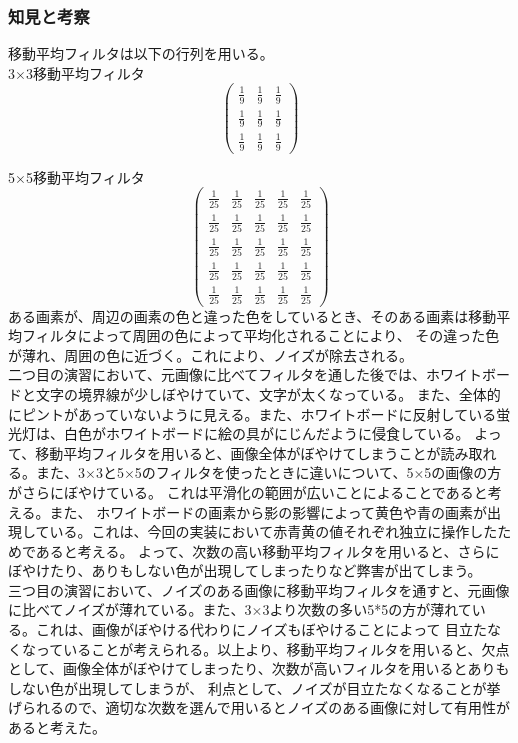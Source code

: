 ﻿\documentclass[a4j,11pt]{jarticle}
\begin{document}
\subsubsection{知見と考察}
移動平均フィルタは以下の行列を用いる。\\
3$\times$3移動平均フィルタ
$$
\begin{pmatrix}
  \frac1 9 & \frac1 9 & \frac1 9 \\
  \frac1 9 & \frac1 9 & \frac1 9 \\
  \frac1 9 & \frac1 9 & \frac1 9  

\end{pmatrix}
$$

5$\times$5移動平均フィルタ
$$
\begin{pmatrix}
  \frac1 {25} & \frac1 {25} & \frac1 {25} & \frac1 {25} & \frac1 {25}\\
  \frac1 {25} & \frac1 {25} & \frac1 {25} & \frac1 {25} & \frac1 {25}\\
  \frac1 {25} & \frac1 {25} & \frac1 {25} & \frac1 {25} & \frac1 {25}\\
  \frac1 {25} & \frac1 {25} & \frac1 {25} & \frac1 {25} & \frac1 {25}\\
  \frac1 {25} & \frac1 {25} & \frac1 {25} & \frac1 {25} & \frac1 {25}
\end{pmatrix}
$$
ある画素が、周辺の画素の色と違った色をしているとき、そのある画素は移動平均フィルタによって周囲の色によって平均化されることにより、
その違った色が薄れ、周囲の色に近づく。これにより、ノイズが除去される。\\
二つ目の演習において、元画像に比べてフィルタを通した後では、ホワイトボードと文字の境界線が少しぼやけていて、文字が太くなっている。
また、全体的にピントがあっていないように見える。また、ホワイトボードに反射している蛍光灯は、白色がホワイトボードに絵の具がにじんだように侵食している。
よって、移動平均フィルタを用いると、画像全体がぼやけてしまうことが読み取れる。また、3$\times$3と5$\times$5のフィルタを使ったときに違いについて、5$\times$5の画像の方がさらにぼやけている。
これは平滑化の範囲が広いことによることであると考える。また、
ホワイトボードの画素から影の影響によって黄色や青の画素が出現している。これは、今回の実装において赤青黄の値それぞれ独立に操作したためであると考える。
よって、次数の高い移動平均フィルタを用いると、さらにぼやけたり、ありもしない色が出現してしまったりなど弊害が出てしまう。\\
三つ目の演習において、ノイズのある画像に移動平均フィルタを通すと、元画像に比べてノイズが薄れている。また、3$\times$3より次数の多い5*5の方が薄れている。これは、画像がぼやける代わりにノイズもぼやけることによって
目立たなくなっていることが考えられる。以上より、移動平均フィルタを用いると、欠点として、画像全体がぼやけてしまったり、次数が高いフィルタを用いるとありもしない色が出現してしまうが、
利点として、ノイズが目立たなくなることが挙げられるので、適切な次数を選んで用いるとノイズのある画像に対して有用性があると考えた。
%
%
\end{document}
